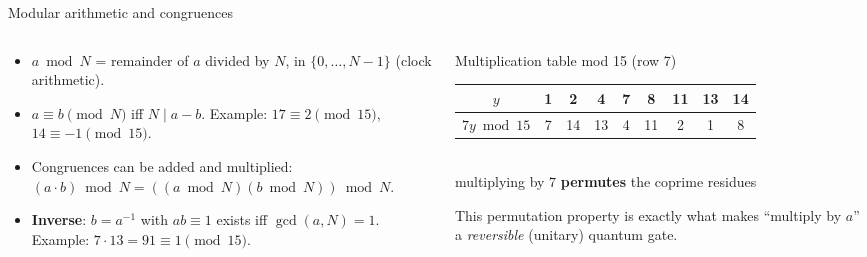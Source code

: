 \documentclass[aspectratio=169,11pt]{beamer}
\newcommand{\hl}[1]{{\color{qorange}\textbf{#1}}}
\newcommand{\key}[1]{{\color{qdark}\textbf{#1}}}
\begin{document}
\begin{frame}[label=fModular]{Modular arithmetic and congruences}
  \begin{columns}[T]
    \begin{column}{0.5\textwidth}
      \small
      \begin{itemize}\itemsep1pt
        \item $a \bmod N$ = remainder of $a$ divided by $N$, in $\{0, \dots, N - 1\}$ (clock arithmetic).
        \item $a \equiv b \pmod N$ iff $N \mid a - b$. Example: $17 \equiv 2 \pmod{15}$, $14 \equiv -1 \pmod{15}$.
        \item Congruences can be added and multiplied: $(a\cdot b) \bmod N = ((a \bmod N)(b \bmod N)) \bmod N$.
        \item \key{Inverse}: $b = a^{-1}$ with $ab \equiv 1$ exists iff $\gcd(a, N) = 1$. Example: $7\cdot13 = 91 \equiv 1 \pmod{15}$.
      \end{itemize}
    \end{column}
    \begin{column}{0.46\textwidth}
      \begin{exampleblock}{Multiplication table mod 15 (row 7)}
        \scriptsize\setlength{\tabcolsep}{3pt}
        \begin{tabular}{c|cccccccc}
          $y$ & 1 & 2 & 4 & 7 & 8 & 11 & 13 & 14\\ \hline
          $7y \bmod 15$ & 7 & 14 & 13 & 4 & 11 & 2 & 1 & 8
        \end{tabular}\\[3pt]
        multiplying by $7$ \hl{permutes} the coprime residues
      \end{exampleblock}
      \small\color{qgrey} This permutation property is exactly what makes ``multiply by $a$'' a \emph{reversible} (unitary) quantum gate.
    \end{column}
  \end{columns}
\end{frame}
\end{document}
